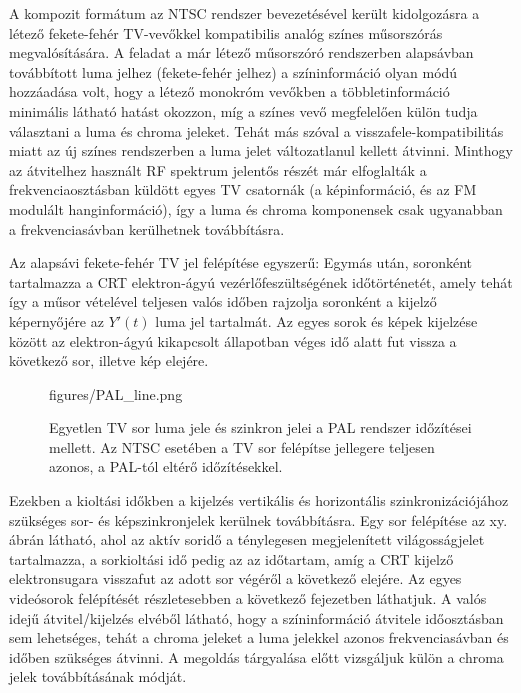 A kompozit formátum az NTSC rendszer bevezetésével került kidolgozásra a létező fekete-fehér TV-vevőkkel kompatibilis analóg színes műsorszórás megvalósítására.
A feladat a már létező műsorszóró rendszerben alapsávban továbbított luma jelhez (fekete-fehér jelhez) a színinformáció olyan módú hozzáadása volt, hogy a létező monokróm vevőkben a többletinformáció minimális látható hatást okozzon, míg a színes vevő megfelelően külön tudja választani a luma és chroma jeleket.
Tehát más szóval a visszafele-kompatibilitás miatt az új színes rendszerben a luma jelet változatlanul kellett átvinni. 
Minthogy az átvitelhez használt RF spektrum jelentős részét már elfoglalták a frekvenciaosztásban küldött egyes TV csatornák (a képinformáció, és az FM modulált hanginformáció), így a luma és chroma komponensek csak ugyanabban a frekvenciasávban kerülhetnek továbbításra.

Az alapsávi fekete-fehér TV jel felépítése egyszerű:
Egymás után, soronként tartalmazza a CRT elektron-ágyú vezérlőfeszültségének időtörténetét, amely tehát így a műsor vételével teljesen valós időben rajzolja soronként a kijelző képernyőjére az $Y'(t)$ luma jel tartalmát.
Az egyes sorok és képek kijelzése között az elektron-ágyú kikapcsolt állapotban véges idő alatt fut vissza a következő sor, illetve kép elejére. 
%
\begin{figure}[]
	\centering
	\begin{minipage}[c]{0.65\textwidth}
	\begin{overpic}[width = 0.95\columnwidth ]{figures/PAL_line.png}
	\end{overpic} \end{minipage}\hfill
	\begin{minipage}[c]{0.35\textwidth}	\caption{Egyetlen TV sor luma jele és szinkron jelei a PAL rendszer időzítései mellett. Az NTSC esetében a TV sor felépítse jellegere teljesen azonos, a PAL-tól eltérő időzítésekkel.}
	\label{Fig:PAL_line}  \end{minipage}
\end{figure}
%
Ezekben a kioltási időkben a kijelzés vertikális és horizontális szinkronizációjához szükséges sor- és képszinkronjelek kerülnek továbbításra. 
Egy sor felépítése az xy. ábrán látható, ahol az aktív soridő a ténylegesen megjelenített világosságjelet tartalmazza, a sorkioltási idő pedig az az időtartam, amíg a CRT kijelző elektronsugara visszafut az adott sor végéről a következő elejére.
Az egyes videósorok felépítését részletesebben a következő fejezetben láthatjuk.
A valós idejű átvitel/kijelzés elvéből látható, hogy a színinformáció átvitele időosztásban sem lehetséges, tehát a chroma jeleket a luma jelekkel azonos frekvenciasávban és időben szükséges átvinni.
A megoldás tárgyalása előtt vizsgáljuk külön a chroma jelek továbbításának módját.

